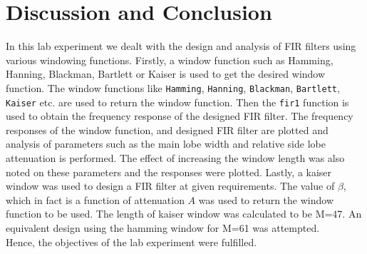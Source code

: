 \documentclass{lab_sheet}
\begin{document}
\section{Discussion and Conclusion}
In this lab experiment we dealt with the design and analysis of FIR filters using various windowing functions. Firstly, a window function such as Hamming, Hanning, Blackman, Bartlett or Kaiser is used to get the desired window function. The window functions like \texttt{Hamming}, \texttt{Hanning}, \texttt{Blackman}, \texttt{Bartlett}, \texttt{Kaiser} etc. are used to return the window function. Then the \texttt{fir1} function is used to obtain the frequency response of the designed FIR filter. The frequency responses of the window function, and designed FIR filter are plotted and analysis of parameters such as the main lobe width and relative side lobe attenuation is performed. The effect of increasing the window length was also noted on these parameters and the responses were plotted. Lastly, a kaiser window was used to design a FIR filter at given requirements. The value of $\beta$, which in fact is a function of attenuation $A$ was used to return the window function to be used. The length of kaiser window was calculated to be M=47. An equivalent design using the hamming window for M=61 was attempted. \\
Hence, the objectives of the lab experiment were fulfilled.
\end{document}
